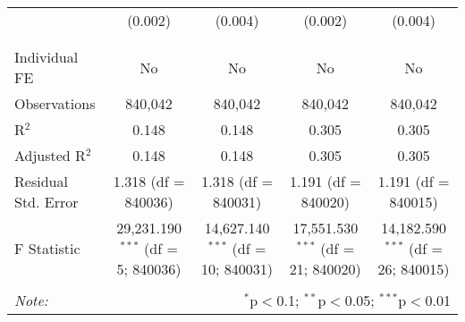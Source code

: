 \documentclass[
]{article}
\begin{document}
\begin{table}[!htbp]
{\begin{tabular}{@{\extracolsep{5pt}}lcccc}
  & (0.002) & (0.004) & (0.002) & (0.004) \\ 
  & & & & \\ 
\hline \\[-1.8ex] 
Individual FE & No & No & No & No \\ 
Observations & 840,042 & 840,042 & 840,042 & 840,042 \\ 
R$^{2}$ & 0.148 & 0.148 & 0.305 & 0.305 \\ 
Adjusted R$^{2}$ & 0.148 & 0.148 & 0.305 & 0.305 \\ 
Residual Std. Error & 1.318 (df = 840036) & 1.318 (df = 840031) & 1.191 (df = 840020) & 1.191 (df = 840015) \\ 
F Statistic & 29,231.190$^{***}$ (df = 5; 840036) & 14,627.140$^{***}$ (df = 10; 840031) & 17,551.530$^{***}$ (df = 21; 840020) & 14,182.590$^{***}$ (df = 26; 840015) \\ 
\hline 
\hline \\[-1.8ex] 
\textit{Note:}  & \multicolumn{4}{r}{$^{*}$p$<$0.1; $^{**}$p$<$0.05; $^{***}$p$<$0.01} \\ 
\end{tabular}
} 
\end{table} 
\newpage
\end{document}
